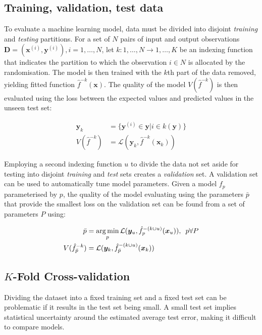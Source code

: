\subsection{Training, validation, test data}

To evaluate a machine learning model, data must be divided into disjoint \emph{training} and \emph{testing} partitions. For a set of $N$ pairs of input and output observations $\bm{D} = (\bm{x}^{(i)}, \bm{y}^{(i)}), i = 1, \ldots, N$, let $k : {1,\ldots,N} \rightarrow {1,\ldots,K}$ be an indexing function that indicates the partition to which the observation $i \in N$ is allocated by the randomisation. The model is then trained with the $k$th part of the data removed, yielding fitted function $\hat{f}^{-k}(\bm{x})$. The quality of the model $V(\hat{f}^{-k})$ is then evaluated using the loss between the expected values and predicted values in the unseen test set:

\begin{align}
  \bm{y}_k &= \{ \bm{y}^{(i)} \in \bm{y} | i \in k(\bm{y}) \} \\
  V(\hat{f}^{-k}) &= \mathcal{L}(\bm{y}_k, \hat{f}^{-k}(\bm{x}_k))
\end{align}

Employing a second indexing function $u$ to divide the data not set aside for testing into disjoint \emph{training} and \emph{test} sets creates a \emph{validation} set. A validation set can be used to automatically tune model parameters. Given a model $f_p$ parameterised by $p$, the quality of the model evaluating using the parameters $\bar{p}$ that provide the smallest loss on the validation set can be found from a set of parameters $P$ using:

\begin{align}
  \bar{p} &= \operatorname*{arg\,min}_p \mathcal{L}(\bm{y}_u, \hat{f}_p^{-(k \cup u)}(\bm{x}_u)), \hspace{.5em} p \forall P\\
  V(\hat{f}_{\bar{p}}^{-k}) &= \mathcal{L}(\bm{y}_k, \hat{f}_{\bar{p}}^{-(k \cup u)}(\bm{x}_k))
\end{align}

\subsection{$K$-Fold Cross-validation}

Dividing the dataset into a fixed training set and a fixed test set can be problematic if it results in the test set being small. A small test set implies statistical uncertainty around the estimated average test error, making it difficult to compare models.

